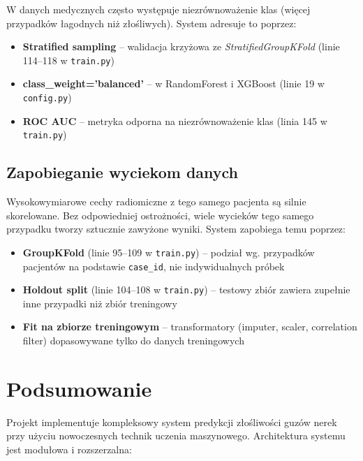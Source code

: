 \documentclass[12pt]{article}
\begin{document}
W danych medycznych często występuje niezrównoważenie klas (więcej przypadków łagodnych niż złośliwych). System adresuje to poprzez:

\begin{itemize}
    \item \textbf{Stratified sampling} – walidacja krzyżowa ze \textit{StratifiedGroupKFold} (linie 114--118 w \texttt{train.py})
    \item \textbf{class\_weight='balanced'} – w RandomForest i XGBoost (linie 19 w \texttt{config.py})
    \item \textbf{ROC AUC} – metryka odporna na niezrównoważenie klas (linia 145 w \texttt{train.py})
\end{itemize}

\subsection{Zapobieganie wyciekom danych}

\begin{tcolorbox}[colframe=orange!75!black, colback=orange!10, title={\large Krytyczne kwestie walidacji w radiomice}, fonttitle=\bfseries]
Wysokowymiarowe cechy radiomiczne z tego samego pacjenta są silnie skorelowane. Bez odpowiedniej ostrożności, wiele wycieków tego samego przypadku tworzy sztucznie zawyżone wyniki. System zapobiega temu poprzez:

\begin{itemize}
    \item \textbf{GroupKFold} (linie 95--109 w \texttt{train.py}) – podział wg. przypadków pacjentów na podstawie \texttt{case\_id}, nie indywidualnych próbek
    \item \textbf{Holdout split} (linie 104--108 w \texttt{train.py}) – testowy zbiór zawiera zupełnie inne przypadki niż zbiór treningowy
    \item \textbf{Fit na zbiorze treningowym} – transformatory (imputer, scaler, correlation filter) dopasowywane tylko do danych treningowych
\end{itemize}
\end{tcolorbox}

\section{Podsumowanie}

Projekt implementuje kompleksowy system predykcji złośliwości guzów nerek przy użyciu nowoczesnych technik uczenia maszynowego. Architektura systemu jest modułowa i rozszerzalna:
\end{document}
